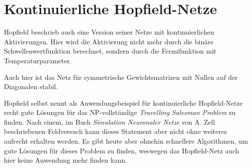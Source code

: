 \section*{Kontinuierliche Hopfield-Netze}
Hopfield beschrieb auch eine Version seiner Netze mit kontinuierlichen Aktivierungen. Hier wird die Aktivierung nicht mehr durch die binäre Schwellenwertfunktion berechnet, sondern durch die Fermifunktion mit Temperaturparameter.

Auch hier ist das Netz für symmetrische Gewichtsmatrizen mit Nullen auf der Diagonalen stabil.

Hopfield selbst nennt als Anwendungsbeispiel für kontinuierliche Hopfield-Netze recht gute Lösungen für das NP-vollständige \emph{Travelling Salesman Problem} zu finden.
Nach einem, im Buch \emph{Simulation Neuronaler Netze} von A. Zell beschriebenen Feldversuch kann dieses Statement aber nicht ohne weiteres aufrecht erhalten werden.
Es gibt heute aber ohnehin schnellere Algorithmen, um gute Lösungen für dieses Problem zu finden, weswegen das Hopfield-Netz auch hier keine Anwendung mehr finden kann.

